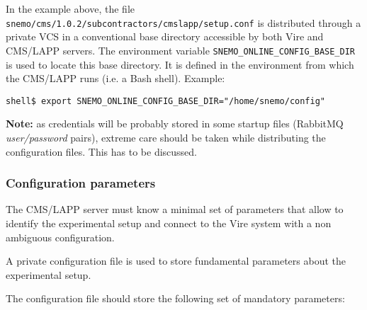 \noindent      In      the      example      above,      the      file
\verb|snemo/cms/1.0.2/subcontractors/cmslapp/setup.conf| is distributed  through a private VCS in
a conventional  base directory  accessible by  both Vire  and CMS/LAPP
servers. The  environment variable \verb|SNEMO_ONLINE_CONFIG_BASE_DIR|
is  used  to  locate  this  base  directory.  It  is  defined  in  the
environment from which the CMS/LAPP runs (i.e. a Bash shell). Example:
\vskip 10pt
\small
\begin{Verbatim}[frame=single,xleftmargin=0.cm,label=\fbox{shell}]
shell$ export SNEMO_ONLINE_CONFIG_BASE_DIR="/home/snemo/config"
\end{Verbatim}
\normalsize

\noindent\textbf{Note:} as credentials will be probably stored in some startup files
(RabbitMQ \emph{user/password} pairs), extreme care should be taken while distributing the configuration
files. This has to be discussed.


\subsubsection{Configuration parameters}

The CMS/LAPP server  must know a minimal set of  parameters that allow
to identify the experimental setup and connect to the Vire system with
a non ambiguous configuration.

A private configuration  file is used to store fundamental parameters about
the experimental setup.

The configuration  file should  store the  following set  of mandatory
parameters:

